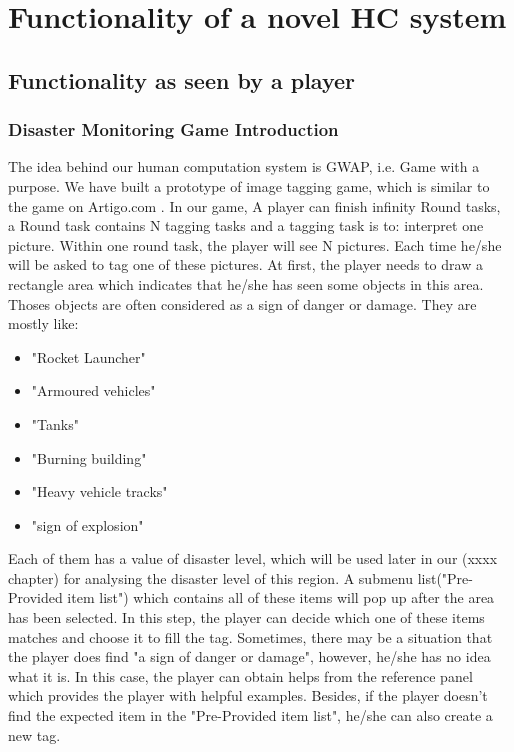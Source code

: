 \section{Functionality of a novel HC system}
  \subsection{Functionality as seen by a player}
      \subsubsection{Disaster Monitoring Game Introduction}
      The idea behind our human computation system is GWAP,
      i.e. Game with a purpose.
      We have built a prototype of image tagging game,
      which is similar to the game on Artigo.com \cite{wieser2013artigo}.
      In our game,
      A player can finish infinity Round tasks, 
      a Round task contains {N} tagging tasks and a tagging task is to:
      interpret one picture.
      Within one round task, the player will see {N} pictures.
      Each time he/she will be asked to tag one of these pictures.
      At first,
      the player needs to draw a rectangle area which indicates that he/she has seen some objects in this area.
      Thoses objects are often considered as a sign of danger or damage.
      They are mostly like:
      
      \begin{itemize}
        \item "Rocket Launcher"
        \item "Armoured vehicles"
        \item "Tanks"
        \item "Burning building"
        \item "Heavy vehicle tracks"
        \item "sign of explosion"
      \end{itemize}

      Each of them has a value of disaster level, 
      which will be used later in our (xxxx chapter) for analysing the disaster level of this region.
      A submenu list("Pre-Provided item list") which contains all of these items will pop up after the area has been selected.
      In this step,
      the player can decide which one of these items matches and choose it to fill the tag.
      Sometimes,
      there may be a situation that the player does find "a sign of danger or damage",
      however, he/she has no idea what it is.
      In this case, 
      the player can obtain helps from the reference panel which provides the player with helpful examples.
      Besides, 
      if the player doesn't find the expected item in the "Pre-Provided item list",
      he/she can also create a new tag.

